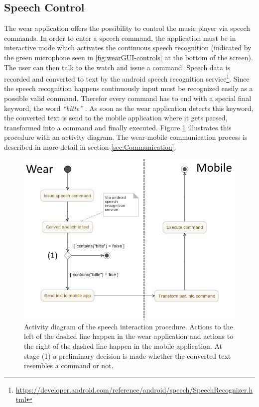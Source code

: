 \subsection{Speech Control}
The wear application offers the possibility to control the music player via speech commands. In order to enter a speech command, the application must be in interactive mode which activates the continuous speech recognition (indicated by the green microphone seen in \ref{fig:wearGUI-controls} at the bottom of the screen). The user can then talk to the watch and issue a command. Speech data is recorded and converted to text by the android speech recognition service\footnote{\url{https://developer.android.com/reference/android/speech/SpeechRecognizer.html}}. Since the speech recognition happens continuously input must be recognized easily as a possible valid command. Therefor every command has to end with a special final keyword, the word \textit{``bitte''} . As soon as the wear application detects this keyword, the converted text is send to the mobile application where it gets parsed, transformed into a command and finally executed. Figure \ref{fig:speechActivityDiagram} illustrates this procedure with an activity diagram. The wear-mobile communication process is described in more detail in section \ref{sec:Communication}.
\begin{figure}[bth]
	\myfloatalign
	\includegraphics[width=.99\linewidth]{img/SpeechActivityDiagram.png}
	\caption{Activity diagram of the speech interaction procedure. Actions to the left of the dashed line happen in the wear application and actions to the right of the dashed line happen in the mobile application. At stage (1) a preliminary decision is made whether the converted text resembles a command or not.}
	\label{fig:speechActivityDiagram}
\end{figure}

